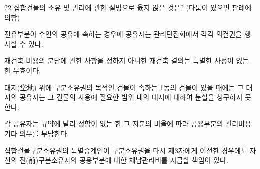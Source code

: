 \begin{question}{22}
집합건물의 소유 및 관리에 관한 설명으로 옳지 \uline{않은} 것은? (다툼이 있으면 판례에 의함)
\begin{choices}
  \item 전유부분이 수인의 공유에 속하는 경우에 공유자는 관리단집회에서 각각 의결권을 행사할 수 있다.
  \item 재건축 비용의 분담에 관한 사항을 정하지 아니한 재건축 결의는 특별한 사정이 없는 한 무효이다.
  \item 대지(垈地) 위에 구분소유권의 목적인 건물이 속하는 1동의 건물이 있을 때에는 그 대지의 공유자는 그 건물의 사용에 필요한 범위 내의 대지에 대하여 분할을 청구하지 못한다.
  \item 각 공유자는 규약에 달리 정함이 없는 한 그 지분의 비율에 따라 공용부분의 관리비용 기타 의무를 부담한다.
  \item 집합건물구분소유권의 특별승계인이 구분소유권을 다시 제3자에게 이전한 경우에도 자신의 전(前)구분소유자의 공용부분에 대한 체납관리비를 지급할 책임이 있다.
\end{choices}
\end{question}
